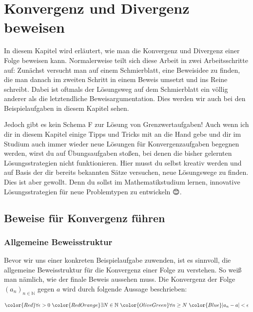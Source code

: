\documentclass[fontsize=9pt,
               parskip=half-,
               DIV=14,
               listof=chapterentry,
               tocflat]{scrbook}
\begin{document}


\chapter{Konvergenz und Divergenz beweisen}

In diesem Kapitel wird erläutert, wie man die Konvergenz und Divergenz einer Folge beweisen kann. Normalerweise teilt sich diese Arbeit in zwei Arbeitsschritte auf: Zunächst versucht man auf einem Schmierblatt, eine Beweisidee zu finden, die man danach im zweiten Schritt in einem Beweis umsetzt und ins Reine schreibt. Dabei ist oftmals der Lösungsweg auf dem Schmierblatt ein völlig anderer als die letztendliche Beweisargumentation. Dies werden wir auch bei den Beispielaufgaben in diesem Kapitel sehen.

Jedoch gibt es kein Schema F zur Lösung von Grenzwertaufgaben! Auch wenn ich dir in diesem Kapitel einige Tipps und Tricks mit an die Hand gebe und dir im Studium auch immer wieder neue Lösungen für Konvergenzaufgaben begegnen werden, wirst du auf Übungsaufgaben stoßen, bei denen die bisher gelernten Lösungsstrategien nicht funktionieren. Hier musst du selbst kreativ werden und auf Basis der dir bereits bekannten Sätze versuchen, neue Lösungswege zu finden. Dies ist aber gewollt. Denn du sollst im Mathematikstudium lernen, innovative Lösungsstrategien für neue Problemtypen zu entwickeln {\DejaSans 😊}.

\section{Beweise für Konvergenz führen}

\subsection{Allgemeine Beweisstruktur}

Bevor wir uns einer konkreten Beispielaufgabe zuwenden, ist es sinnvoll, die allgemeine Beweisstruktur für die Konvergenz einer Folge zu verstehen. So weiß man nämlich, wie der finale Beweis aussehen muss. Die Konvergenz der Folge $(a_{n})_{n\in \mathbb {N} }$ gegen $a$ wird durch folgende Aussage beschrieben:

\begin{align*}
{\color {Red}\forall \epsilon >0}\ {\color {RedOrange}\exists N\in \mathbb {N} }\ {\color {OliveGreen}\forall n\geq N}\ {\color {Blue}|a_{n}-a|<\epsilon }
\end{align*}
\end{document}
